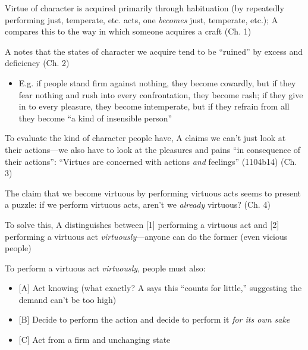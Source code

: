 \documentclass[11pt]{article}
\begin{document}
\noindent Virtue of character is acquired primarily through habituation (by repeatedly performing just, temperate, etc. acts, one \emph{becomes} just, temperate, etc.); A compares this to the way in which someone acquires a craft (Ch. 1)
\vspace*{1mm}

\noindent A notes that the states of character we acquire tend to be ``ruined'' by excess and deficiency (Ch. 2)

\begin{itemize}\item{E.g. if people stand firm against nothing, they  become cowardly, but if they fear nothing and rush into every confrontation, they become rash; if they give in to every pleasure, they become intemperate, but if they refrain from all they become ``a kind of insensible person''}\end{itemize}

\noindent To evaluate the kind of character people have, A claims we can't just look at their actions---we also have to look at the pleasures and pains ``in consequence of their actions'': ``Virtues are concerned with actions \emph{and} feelings'' (1104b14) (Ch. 3)
\vspace*{2mm}

\noindent The claim that we become virtuous by performing virtuous acts seems to present a puzzle: if we perform virtuous acts, aren't we \emph{already} virtuous? (Ch. 4)
\vspace*{2mm}

\noindent To solve this, A distinguishes between [1] performing a virtuous act and [2] performing a virtuous act \emph{virtuously}---anyone can do the former (even vicious people)
\vspace*{2mm}

\noindent To perform a virtuous act \emph{virtuously}, people must also:
\begin{itemize}\item{[A] Act knowing (what exactly? A says this ``counts for little,'' suggesting the demand can't be too high)}\item{[B] Decide to perform the action and decide to perform it \emph{for its own sake}}\item{[C] Act from a firm and unchanging state}\end{itemize}
\end{document}

